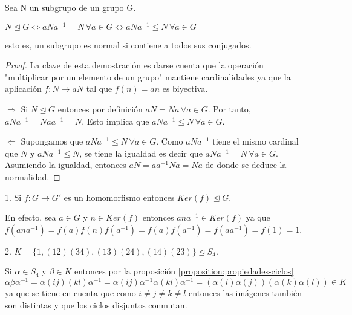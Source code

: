 \begin{nth}\label{theorem:criterio-normalidad}
Sea N un subgrupo de un grupo G. 

$N \unlhd G \iff aNa^{-1} = N  \, \forall a \in G \iff aNa^{-1} \le N \, \forall a \in G$ 

esto es, un subgrupo es normal si contiene a todos sus conjugados.
\end{nth}
\begin{proof}
La clave de esta demostración es darse cuenta que la operación "multiplicar por un elemento de un grupo" mantiene cardinalidades ya que la aplicación $f:N \rightarrow aN$ tal que $f(n) = an$ es biyectiva.

$\Rightarrow$ Si $N \unlhd G$ entonces por definición $aN = Na \, \forall a \in G$. Por tanto, $aNa^{-1} = Naa^{-1} = N$. Esto implica que $aNa^{-1} \le N \, \forall a \in G$.

$\Leftarrow$ Supongamos que $aNa^{-1} \le N \, \forall a \in G$. Como $aNa^{-1}$ tiene el mismo cardinal que $N$ y $aNa^{-1} \le N$, se tiene la igualdad es decir que $aNa^{-1} = N \, \forall a \in G$. Asumiendo la igualdad, entonces $aN = aa^{-1}Na = Na$ de donde se deduce la normalidad.
\end{proof}

\begin{ejemplo}
1. Si $f:G \rightarrow G'$ es un homomorfismo entonces $Ker(f) \trianglelefteq G$.

En efecto, sea $a \in G$ y $n \in Ker(f)$ entonces $ana^{-1} \in Ker(f)$ ya que $f(ana^{-1}) = f(a)f(n)f(a^{-1}) = f(a)f(a^{-1}) = f(aa^{-1}) = f(1) = 1$.

2. $K = \{1,(12)(34),(13)(24),(14)(23)\} \trianglelefteq S_4$.

Si $\alpha \in S_4$ y $\beta \in K$ entonces por la proposición \ref{proposition:propiedades-ciclos} $\alpha \beta  \alpha^{-1} = \alpha (ij)(kl) \alpha^{-1} =\alpha (ij) \alpha^{-1} \alpha (kl) \alpha^{-1} = (\alpha(i) \alpha(j))(\alpha(k) \alpha(l)) \in K$ ya que se tiene en cuenta que como  $i \neq j \neq k \neq l$ entonces las imágenes también son distintas y que los ciclos disjuntos conmutan.
\end{ejemplo}

